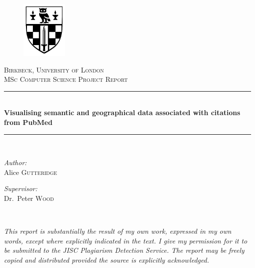\documentclass[Report.tex]{subfiles}
\newcommand{\HRule}{\rule{\linewidth}{0.5mm}}
\begin{document}
\thispagestyle{empty}

\begin{center}
\begin{figure}[!ht]
\begin{center}
	\includegraphics[width=0.2\textwidth]{../lib/images/shield}
\end{center}
\end{figure}

\textsc{\LARGE Birkbeck, University of London}\\[1.5cm]

\textsc{\Large MSc Computer Science Project Report}\\[0.5cm]

\HRule \\[0.4cm]
{ \huge \bfseries Visualising semantic and geographical data associated with citations from PubMed\\[0.4cm] }

\HRule \\[1.5cm]

\noindent
\begin{minipage}[t]{0.4\textwidth}
\begin{flushleft} \large
\emph{Author:}\\
Alice \textsc{Gutteridge}
\end{flushleft}
\end{minipage}%
\begin{minipage}[t]{0.4\textwidth}
\begin{flushright} \large
\emph{Supervisor:} \\
Dr.~Peter \textsc{Wood}
\end{flushright}
\end{minipage}\\

\vfill

\emph{This report is substantially the result of my own work, expressed in my own words, except where explicitly indicated in the text. I give my permission for it to be submitted to the JISC Plagiarism Detection Service. The report may be freely copied and distributed provided the source is explicitly acknowledged.}

\end{center}
\end{document}
